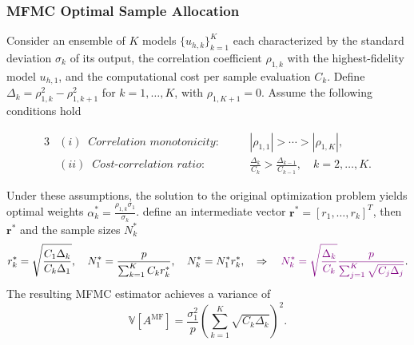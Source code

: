 \documentclass{beamer}
\newcommand{\JLcolor}[1]{{\textcolor{violet}{#1}}} %
\begin{document}
\begin{frame}[t]
    \frametitle{MFMC Optimal Sample Allocation}
        {\fontsize{8}{8}\selectfont 
        \begin{theorem}
        \label{thm:Sample_size_est}
        Consider an ensemble of $K$ models $\{u_{h,k}\}_{k=1}^K$ each characterized by the standard deviation $\sigma_k$ of its output, the correlation coefficient $\rho_{1,k}$ with the highest-fidelity model $u_{h,1}$, and the computational cost per sample evaluation $C_k$. Define $\Delta_k = \rho_{1,k}^2 - \rho_{1,k+1}^2$ for $k = 1, \dots, K$, with $\rho_{1,K+1} = 0$. Assume the following conditions hold
        \vspace{-5mm}
        
        \begin{alignat*}{3}
        &(i)\;\; \textit{Correlation monotonicity}: \quad && |\rho_{1,1}| > \cdots > |\rho_{1,K}|, \\ 
        &(ii)\;\; \textit{Cost-correlation ratio}: \quad && \frac{\Delta_{k}}{C_k} > \frac{\Delta_{k-1}}{C_{k-1}}, \quad k=2,\ldots,K. 
        \end{alignat*}
        
        \vspace{-3mm}
        Under these assumptions, the solution to the original optimization problem  yields optimal weights $\alpha_k^*=\frac{\rho_{1,k}\sigma_1}{\sigma_k}$.
        define an intermediate vector $\boldsymbol{r}^* = [r_1,\ldots,r_k]^T$, then $\boldsymbol{r}^*$ and the sample sizes $N_k^*$
        \vspace{-3mm}
        \[
        r_k^* = \sqrt{\frac{C_1\Delta_k}{C_k\Delta_1}},\quad N_1^* = \frac{p}{\sum_{k=1}^K C_k r^*_k}, \quad N_k^*=N_1^*r_k^*,\quad \Rightarrow \quad \JLcolor{N_k^* = \sqrt{\frac{\Delta_k}{C_k}}\frac{p}{\sum_{j=1}^K \sqrt{C_j\Delta_j}}}.
        \] 
        \vspace{-3mm}
        The resulting MFMC estimator achieves a variance of
        \begin{equation*}
        \label{eq:MFMC_variance_optimal}
        \mathbb{V}\left[A^{\text{MF}}\right] =
        \frac{\sigma_1^2}{p}\left(\sum_{k=1}^K\sqrt{C_k\Delta_{k}}\right)^2.
        \end{equation*}
        \end{theorem}
        }


\end{frame}
\end{document}
